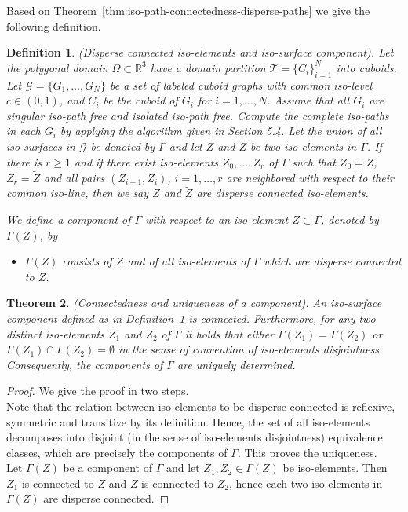 \documentclass[a4paper,11pt]{article}
\newtheorem{theorem}{Theorem}[section]
\newtheorem{definition}[theorem]{Definition}
\begin{document}
\noindent Based on Theorem~\ref{thm:iso-path-connectedness-disperse-paths} we give the following definition.
\begin{definition}(Disperse connected iso-elements and iso-surface component).
Let the polygonal domain $\Omega\subset\mathbb{R}^3$ have a domain partition $\mathcal{T}=\{C_i\}_{i=1}^N$ into cuboids. Let $\mathcal{G}=\{G_1,\ldots,G_N\}$ be a set of labeled
cuboid graphs with common iso-level $c\in (0,1)$, and $C_i$ be the cuboid of $G_i$ for $i=1,\ldots,N$.
Assume that all $G_i$ are singular iso-path free and isolated iso-path free.
Compute the complete iso-paths in each $G_i$ by applying the algorithm given in Section 5.4.
Let the union of all iso-surfaces in $\mathcal{G}$ be denoted by $\Gamma$ and let
$Z$ and $\tilde{Z}$ be two iso-elements in $\Gamma$. If there is $r\geq 1$ and
if there exist iso-elements $Z_0,\ldots,Z_r$ of $\Gamma$ such that
$Z_0=Z$, $Z_r=\tilde{Z}$ and all pairs $(Z_{i-1},Z_i)$, $i=1,\ldots,r$ are neighbored with respect
to their common iso-line, then we say $Z$ and $\tilde{Z}$ are disperse connected iso-elements.

We define a component of $\Gamma$ with respect to an iso-element $Z\subset\Gamma$, denoted by $\Gamma(Z)$, by
\begin{itemize}
\item $\Gamma(Z)$ consists of $Z$ and of all iso-elements of $\Gamma$ which are disperse connected to $Z$.
\end{itemize}
\label{def:component-2}
\end{definition}

\begin{theorem}(Connectedness and uniqueness of a component).
An iso-surface component defined as in Definition~\ref{def:component-2} is connected. Furthermore,
for any two distinct iso-elements $Z_1$ and $Z_2$ of $\Gamma$ it holds that either
$\Gamma(Z_1)=\Gamma(Z_2)$ or $\Gamma(Z_1)\cap\Gamma(Z_2)=\emptyset$ in the sense of
{\it convention of iso-elements disjointness}. Consequently, the components of $\Gamma$ are uniquely
determined.
\label{thm:iso-element-connected}
\end{theorem}
\begin{proof}We give the proof in two steps. \\

Note that the relation between iso-elements to be disperse
connected is reflexive, symmetric and transitive by its definition. Hence, the set of all iso-elements
decomposes into disjoint (in the sense of iso-elements disjointness) equivalence classes, which are
precisely the components of $\Gamma$. This proves the uniqueness.\\


Let $\Gamma(Z)$ be a component of $\Gamma$ and let
$Z_1,Z_2\in\Gamma(Z)$ be iso-elements. Then $Z_1$ is connected to $Z$ and $Z$ is connected to $Z_2$,
hence each two iso-elements in $\Gamma(Z)$ are disperse connected.
\end{proof}
\end{document}
